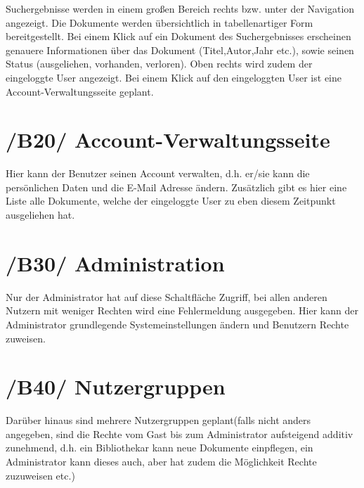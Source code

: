 Suchergebnisse werden in einem großen Bereich rechts bzw. unter der Navigation angezeigt. Die Dokumente werden übersichtlich in tabellenartiger Form bereitgestellt. Bei einem Klick auf ein Dokument des Suchergebnisses erscheinen genauere Informationen über das Dokument (Titel,Autor,Jahr etc.), sowie
seinen Status (ausgeliehen, vorhanden, verloren).
Oben rechts wird zudem der eingeloggte User angezeigt.
Bei einem Klick auf den eingeloggten User ist eine Account-Verwaltungsseite geplant.



\section{/B20/ Account-Verwaltungsseite}
  	 	
Hier kann der Benutzer seinen Account verwalten, d.h. er/sie kann die persönlichen Daten und die E-Mail Adresse ändern.
Zusätzlich gibt es hier eine Liste alle Dokumente, welche der eingeloggte User zu eben diesem Zeitpunkt ausgeliehen hat.



\section{/B30/ Administration}

Nur der Administrator hat auf diese Schaltfläche Zugriff, bei allen anderen Nutzern mit weniger Rechten wird eine Fehlermeldung ausgegeben.
Hier kann der Administrator grundlegende Systemeinstellungen ändern und Benutzern Rechte zuweisen.



\section{/B40/ Nutzergruppen}

Darüber hinaus sind mehrere Nutzergruppen geplant(falls nicht anders angegeben, sind die Rechte vom Gast bis zum Administrator aufsteigend additiv zunehmend, d.h. ein Bibliothekar kann neue Dokumente einpflegen, ein Administrator kann dieses auch, aber hat zudem die Möglichkeit Rechte zuzuweisen etc.) 

